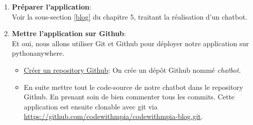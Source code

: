 \documentclass[a4paper,11pt]{article}
\begin{document}
        \begin{enumerate}
            \item \textbf{Préparer l'application}:\\
                \noindent Voir la sous-section \ref{blog} du chapitre 5, traitant la réalisation d'un chatbot. 
            
            \item \textbf{Mettre l'application sur Github}:\\
                \noindent Et oui, nous allons utiliser Git et Github pour déployer notre application sur 
                pythonanywhere.
                \begin{itemize}
                    \item \underline{Créer un repository Github}: On crée un dépôt Github nommé \textit{chatbot}.
                    \item En suite mettre tout le code-source de notre chatbot dans le repository Github. 
                        En prenant soin de bien commenter tous les commits. Cette application est ensuite clonable avec git 
                        via \url{https://github.com/codewithmpia/codewithmpia-blog.git}.
                \end{itemize}


\end{enumerate}
\end{document}

